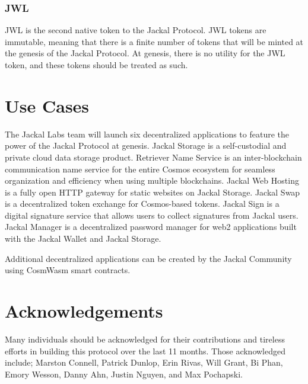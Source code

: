 \documentclass[a4paper]{article}
\begin{document}
\subsubsection{JWL}
JWL is the second native token to the Jackal Protocol. JWL tokens are immutable, meaning that there is a finite number of tokens that will be minted at the genesis of the Jackal Protocol. At genesis, there is no utility for the JWL token, and these tokens should be treated as such. 

\section{Use Cases}
The Jackal Labs team will launch six decentralized applications to feature the power of the Jackal Protocol at genesis. Jackal Storage is a self-custodial and private cloud data storage product. Retriever Name Service is an inter-blockchain communication name service for the entire Cosmos ecosystem for seamless organization and efficiency when using multiple blockchains. Jackal Web Hosting is a fully open HTTP gateway for static websites on Jackal Storage. Jackal Swap is a decentralized token exchange for Cosmos-based tokens. Jackal Sign is a digital signature service that allows users to collect signatures from Jackal users. Jackal Manager is a decentralized password manager for web2 applications built with the Jackal Wallet and Jackal Storage. 

Additional decentralized applications can be created by the Jackal Community using CosmWasm smart contracts. 

\section{Acknowledgements}
Many individuals should be acknowledged for their contributions and tireless efforts in building this protocol over the last 11 months. Those acknowledged include; Marston Connell, Patrick Dunlop, Erin Rivas, Will Grant, Bi Phan, Emory Wesson, Danny Ahn, Justin Nguyen, and Max Pochapski. 

\newpage
\printbibliography %
\end{document}
